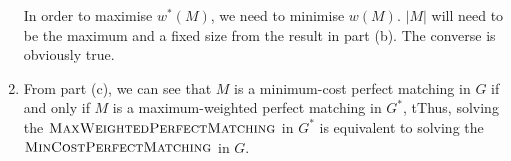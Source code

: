 \documentclass{article}
\begin{document}
\begin{solution}
\begin{enumerate}[label = (\alph*)]
In order to maximise $w^*(M)$, we need to minimise $w(M)$. $|M|$ will need to be the maximum and a fixed size from the result in part (b). The converse is obviously true.

    \item From part (c), we can see that $M$ is a minimum-cost perfect matching in $G$ if and only if $M$ is a maximum-weighted perfect matching in $G^*$, tThus, solving the $\mathsf{\textsc{MaxWeightedPerfectMatching}}$ in $G^*$ is equivalent to solving the $\mathsf{\textsc{MinCostPerfectMatching}}$ in $G$.
\end{enumerate}
\end{solution}
\end{document}
